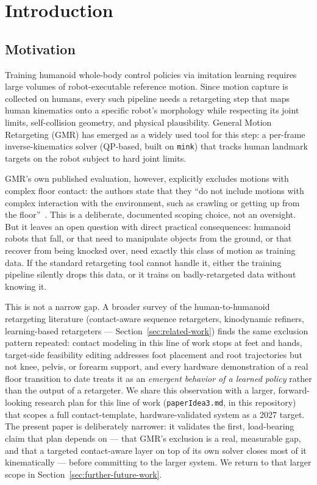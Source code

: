 \section{Introduction}
\label{sec:introduction}

\subsection{Motivation}
\label{sec:motivation}

Training humanoid whole-body control policies via imitation learning
requires large volumes of robot-executable reference motion. Since motion
capture is collected on humans, every such pipeline needs a retargeting step
that maps human kinematics onto a specific robot's morphology while
respecting its joint limits, self-collision geometry, and physical
plausibility. General Motion Retargeting (GMR) has emerged as a widely used
tool for this step: a per-frame inverse-kinematics solver (QP-based, built on
\texttt{mink}) that tracks human landmark targets on the robot subject to
hard joint limits.

GMR's own published evaluation, however, explicitly excludes motions with
complex floor contact: the authors state that they ``do not include motions
with complex interaction with the environment, such as crawling or getting
up from the floor''~\cite{araujo2025gmr}. This is a deliberate, documented
scoping choice, not an oversight. But it leaves an open question with direct
practical consequences: humanoid robots that fall, or that need to
manipulate objects from the ground, or that recover from being knocked over,
need exactly this class of motion as training data. If the standard
retargeting tool cannot handle it, either the training pipeline silently
drops this data, or it trains on badly-retargeted data without knowing it.

This is not a narrow gap. A broader survey of the human-to-humanoid
retargeting literature (contact-aware sequence retargeters, kinodynamic
refiners, learning-based retargeters --- Section~\ref{sec:related-work})
finds the same exclusion pattern repeated: contact modeling in this line of
work stops at feet and hands, target-side feasibility editing addresses foot
placement and root trajectories but not knee, pelvis, or forearm support,
and every hardware demonstration of a real floor transition to date treats
it as an \textit{emergent behavior of a learned policy} rather than the
output of a retargeter. We share this observation with a larger,
forward-looking research plan for this line of work (\texttt{paperIdea3.md},
in this repository) that scopes a full contact-template, hardware-validated
system as a 2027 target. The present paper is deliberately narrower: it
validates the first, load-bearing claim that plan depends on --- that GMR's
exclusion is a real, measurable gap, and that a targeted contact-aware layer
on top of its own solver closes most of it kinematically --- before
committing to the larger system. We return to that larger scope in
Section~\ref{sec:further-future-work}.

